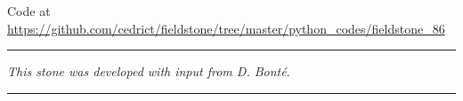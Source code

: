 \begin{center}
Code at \url{https://github.com/cedrict/fieldstone/tree/master/python_codes/fieldstone_86}
\end{center}

\par\noindent\rule{\textwidth}{0.4pt}

{\sl This stone was developed with input from D. Bont{\'e}}. 

\par\noindent\rule{\textwidth}{0.4pt}



